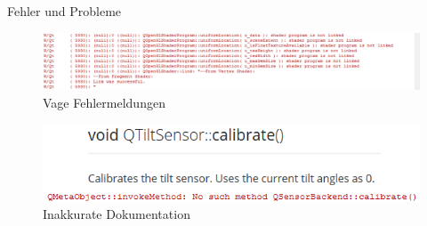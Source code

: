 \begin{frame}{Fehler und Probleme}
	\begin{figure}
		\centering
		\includegraphics[width=\textwidth, height=0.2\textheight, keepaspectratio]{images/linkerrorsuccess}
		\caption{Vage Fehlermeldungen}
	\end{figure}
	\begin{figure}
		\centering
		\includegraphics[width=\textwidth, height=0.17\textheight, keepaspectratio]{images/QMLCalibrate}
		 \caption{Inakkurate Dokumentation}
	\end{figure}
\end{frame}

